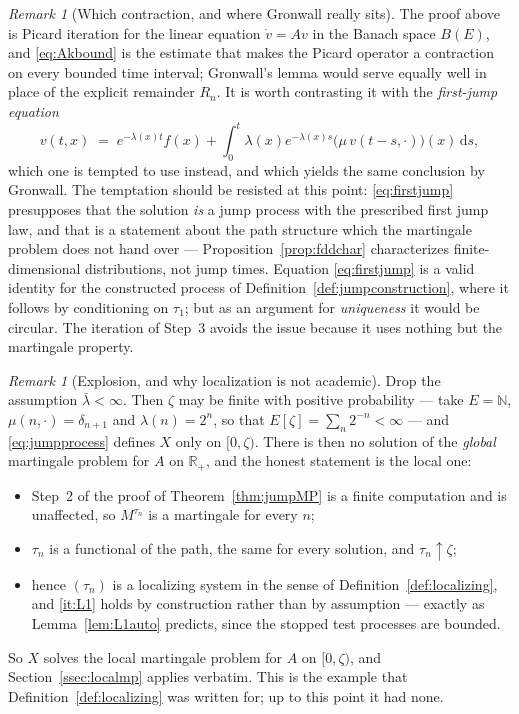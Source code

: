 \documentclass[11pt,a4paper]{article}
\theoremstyle{plain}
\theoremstyle{definition}
\theoremstyle{remark}
\newtheorem{remark}[theorem]{Remark}
\newcommand{\R}{\mathbb{R}}
\newcommand{\N}{\mathbb{N}}
\newcommand{\Rp}{\R_+}
\newcommand{\Bdd}{B}                           %
\newcommand{\dif}{\,\mathrm{d}}
\begin{document}
\begin{remark}[Which contraction, and where Gronwall really sits]
  \label{rem:jumpgronwall}
  The proof above is Picard iteration for the linear equation $\dot v = Av$ in the
  Banach space $\Bdd(E)$, and \eqref{eq:Akbound} is the estimate that makes the
  Picard operator a contraction on every bounded time interval; Gronwall's lemma
  would serve equally well in place of the explicit remainder $R_n$.  It is worth
  contrasting it with the \emph{first-jump equation}
  \begin{equation}
    \label{eq:firstjump}
    v(t,x) \;=\; e^{-\lambda(x)t} f(x)
      + \int_0^t \lambda(x) e^{-\lambda(x)s}
        \bigl( \mu\, v(t-s,\cdot) \bigr)(x) \dif s ,
  \end{equation}
  which one is tempted to use instead, and which yields the same conclusion by
  Gronwall.  The temptation should be resisted at this point: \eqref{eq:firstjump}
  presupposes that the solution \emph{is} a jump process with the prescribed first
  jump law, and that is a statement about the path structure which the martingale
  problem does not hand over --- Proposition~\ref{prop:fddchar} characterizes
  finite-dimensional distributions, not jump times.  Equation \eqref{eq:firstjump}
  is a valid identity for the constructed process of
  Definition~\ref{def:jumpconstruction}, where it follows by conditioning on
  $\tau_1$; but as an argument for \emph{uniqueness} it would be circular.  The
  iteration of Step~3 avoids the issue because it uses nothing but the martingale
  property.
\end{remark}

\begin{remark}[Explosion, and why localization is not academic]
  \label{rem:jumpexplosion}
  Drop the assumption $\bar\lambda < \infty$.  Then $\zeta$ may be finite with
  positive probability --- take $E = \N$, $\mu(n,\cdot) = \delta_{n+1}$ and
  $\lambda(n) = 2^n$, so that $E[\zeta] = \sum_n 2^{-n} < \infty$ --- and
  \eqref{eq:jumpprocess} defines $X$ only on $[0,\zeta)$.  There is then no
  solution of the \emph{global} martingale problem for $A$ on $\Rp$, and the
  honest statement is the local one:
  \begin{itemize}
  \item Step~2 of the proof of Theorem~\ref{thm:jumpMP} is a finite computation
    and is unaffected, so $M^{\tau_n}$ is a martingale for every $n$;
  \item $\tau_n$ is a functional of the path, the same for every solution, and
    $\tau_n \uparrow \zeta$;
  \item hence $(\tau_n)$ is a localizing system in the sense of
    Definition~\ref{def:localizing}, and \ref{it:L1} holds by construction rather
    than by assumption --- exactly as Lemma~\ref{lem:L1auto} predicts, since the
    stopped test processes are bounded.
  \end{itemize}
  So $X$ solves the local martingale problem for $A$ on $[0,\zeta)$, and
  Section~\ref{ssec:localmp} applies verbatim.  This is the example that
  Definition~\ref{def:localizing} was written for; up to this point it had none.
\end{remark}
\end{document}
